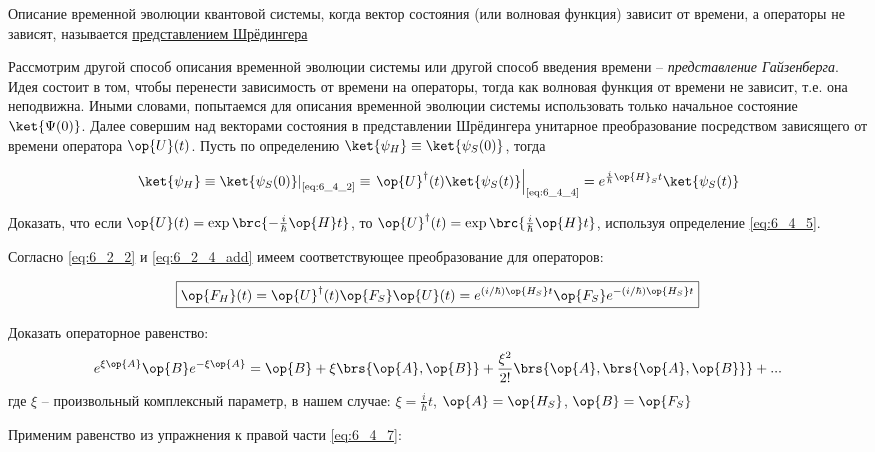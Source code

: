 \begin{defn}
Описание временной эволюции квантовой системы, когда вектор состояния (или волновая функция) зависит от времени, а операторы не зависят, называется \underline{представлением Шрёдингера}
\end{defn}

Рассмотрим другой способ описания временной эволюции системы или другой способ введения времени -- {\em представление Гайзенберга}. Идея состоит в том, чтобы перенести зависимость от времени на операторы, тогда как волновая функция от времени не зависит, т.е. она неподвижна. Иными словами, попытаемся для описания временной эволюции системы использовать только начальное состояние $\ket{\Psi(0)}$. Далее совершим над векторами состояния в представлении Шрёдингера унитарное преобразование посредством зависящего от времени оператора $\op{U}(t)$. Пусть по определению $\ket{\psi_H} \equiv \ket{\psi_S(0)}$, тогда

\begin{equation}
\label{eq:6_4_6}
	\left. \ket{\psi_H} \equiv \ket{\psi_S(0)} \right|_\text{\eqref{eq:6_4_2}} \equiv 
	\left.  \op{U}^\dag(t) \ket{\psi_S(t)} \right|_\text{\eqref{eq:6_4_4}} =
	e^{\frac{i}{\hbar}\op{H}_St} \ket{\psi_S(t)}
\end{equation}

\begin{excr}
Доказать, что если $\op{U}(t)=\exp\brc{-\frac{i}{\hbar}\op{H}t}$, то $\op{U}^\dag(t) = \exp\brc{\frac{i}{\hbar}\op{H}t}$, используя определение \eqref{eq:6_4_5}.
\end{excr}

Согласно \eqref{eq:6_2_2} и \eqref{eq:6_2_4_add} имеем соответствующее преобразование для операторов:

\begin{equation}
\label{eq:6_4_7}
\boxed{
	\op{F_H}(t) = \op{U}^\dag(t) \op{F_S} \op{U}(t) = e^{(i/\hbar) \op{H_S}t} \op{F_S} e^{-(i/\hbar) \op{H_S}t}
}
\end{equation}

\begin{excr}
Доказать операторное равенство:
$$
e^{\xi \op{A}} \op{B} e^{-\xi \op{A}} = \op{B} + \xi \brs{\op{A}, \op{B}} + \frac{\xi^2}{2!} \brs{\op{A}, \brs{\op{A}, \op{B}}} + ...
$$
где $\xi$ -- произвольный комплексный параметр, в нашем случае: $\xi = \frac{i}{\hbar} t$, $\op{A} = \op{H_S}$, $\op{B} = \op{F_S}$
\end{excr}

Применим равенство из упражнения к правой части \eqref{eq:6_4_7}:

